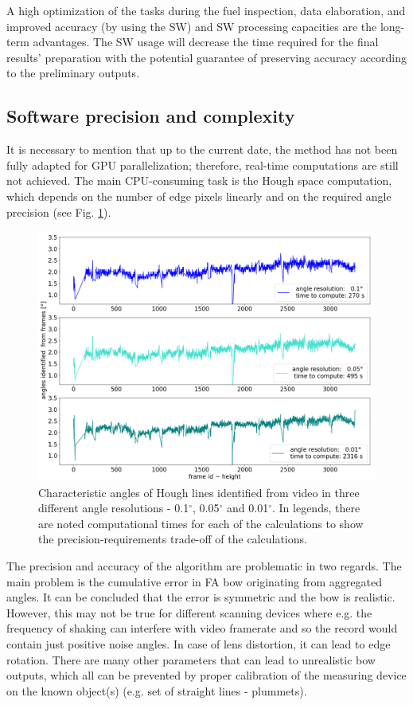 \documentclass[preprint,12pt]{elsarticle}
\begin{document}
A high optimization of the tasks during the fuel inspection, data elaboration, and improved accuracy (by using the \ac{SW}) and \ac{SW} processing capacities are the long-term advantages. The \ac{SW} usage will decrease the time required for the final results' preparation with the potential guarantee of preserving accuracy according to the preliminary outputs.

\subsection{Software precision and complexity}

It is necessary to mention that up to the current date, the method has not been fully adapted for GPU parallelization; therefore, real-time computations are still not achieved. The main CPU-consuming task is the Hough space computation, which depends on the number of edge pixels linearly and on the required angle precision (see Fig. \ref{fig:angles-resolution}).

\begin{figure}
    \includegraphics[width=\linewidth]{Angles-resolution.png}
    \caption{Characteristic angles of Hough lines identified from video in three different angle resolutions - 0.1$^\circ$, 0.05$^\circ$ and 0.01$^\circ$. In legends, there are noted computational times for each of the calculations to show the precision-requirements  trade-off of the calculations.}
\label{fig:angles-resolution}
\end{figure}

The precision and accuracy of the algorithm are problematic in two regards. The main problem is the cumulative error in \ac{FA} bow originating from aggregated angles. It can be concluded that the error is symmetric and the bow is realistic. However, this may not be true for different scanning devices where e.g. the frequency of shaking can interfere with video framerate and so the record would contain just positive noise angles. In case of lens distortion, it can lead to edge rotation. There are many other parameters that can lead to unrealistic bow outputs, which all can be prevented by proper calibration of the measuring device on the known object(s) (e.g. set of straight lines - plummets). 
\end{document}
